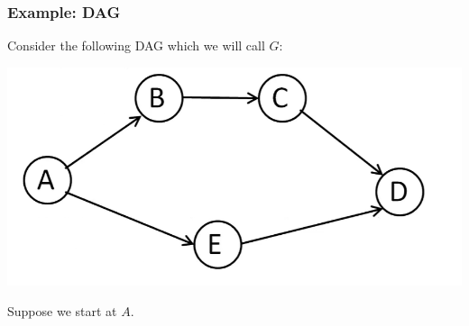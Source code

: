 \documentclass[letterpaper]{article}
\begin{document}
\subsubsection{Example: DAG}
Consider the following DAG which we will call $G$:
\begin{center}
    \includegraphics[scale=0.4]{../assets/dag_ex.png}
\end{center}
Suppose we start at $A$.
\end{document}
